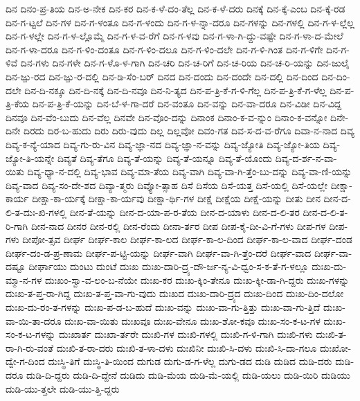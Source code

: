 {ದಿನ
ದಿನಂ-ಪ್ರ-ತಿಯ
ದಿನ-ಅ-ನೇಕ
ದಿನ-ಕರ
ದಿನ-ಕ-ಳೆ-ದಂ-ತೆಲ್ಲ
ದಿನ-ಕ-ಳೆ-ದರು
ದಿನಕ್ಕೆ
ದಿನ-ಕ್ಕೆ-ಎಂಬ
ದಿನ-ಕ್ಕೆ-ರಡ
ದಿನ-ಗ-ಟ್ಟಲೆ
ದಿನ-ಗಳ
ದಿನ-ಗ-ಳಂತೂ
ದಿನ-ಗ-ಳಂದು
ದಿನ-ಗ-ಳ-ನ್ನಾ-ದರೂ
ದಿನ-ಗಳನ್ನು
ದಿನ-ಗಳಲ್ಲಿ
ದಿನ-ಗ-ಳ-ಲ್ಲೆಲ್ಲ
ದಿನ-ಗ-ಳಲ್ಲೇ
ದಿನ-ಗ-ಳ-ಲ್ಲೊಮ್ಮೆ
ದಿನ-ಗ-ಳ-ವ-ರೆಗೆ
ದಿನ-ಗ-ಳವು
ದಿನ-ಗ-ಳಾ-ಗಿ-ದ್ದು-ವಷ್ಟೇ
ದಿನ-ಗ-ಳಾ-ದ-ಮೇಲೆ
ದಿನ-ಗ-ಳಾ-ದರೂ
ದಿನ-ಗ-ಳಿಂ-ದಂತೂ
ದಿನ-ಗ-ಳಿಂ-ದಲೂ
ದಿನ-ಗ-ಳಿಂ-ದಲೇ
ದಿನ-ಗ-ಳಿ-ಗಿಂತ
ದಿನ-ಗ-ಳಿಗೇ
ದಿನ-ಗ-ಳಿವೆ
ದಿನ-ಗಳು
ದಿನ-ಗಳೇ
ದಿನ-ಗ-ಳೊ-ಳ-ಗಾಗಿ
ದಿನ-ಚರಿ
ದಿನ-ಚ-ರಿಗೆ
ದಿನ-ಚ-ರಿಯ
ದಿನ-ಚ-ರಿ-ಯನ್ನು
ದಿನ-ಜುಲೈ
ದಿನ-ಜ್ಪು-ರದ
ದಿನ-ಜ್ಪು-ರ-ದಲ್ಲಿ
ದಿನ-ಡಿ-ಸೆಂ-ಬರ್
ದಿನದ
ದಿನ-ದಂದು
ದಿನ-ದಂದೇ
ದಿನ-ದಲ್ಲಿ
ದಿನ-ದಿಂದ
ದಿನ-ದಿಂ-ದಲೇ
ದಿನ-ದಿ-ನಕ್ಕೂ
ದಿನ-ದಿ-ನಕ್ಕೆ
ದಿನ-ದಿ-ನವೂ
ದಿನ-ನಿ-ತ್ಯದ
ದಿನ-ಪ-ತ್ರಿ-ಕೆ-ಗ-ಳಿ-ಗೆಲ್ಲ
ದಿನ-ಪ-ತ್ರಿ-ಕೆ-ಗ-ಳೆಲ್ಲ
ದಿನ-ಪ-ತ್ರಿ-ಕೆಯ
ದಿನ-ಪ-ತ್ರಿ-ಕೆ-ಯನ್ನು
ದಿನ-ಬೆ-ಳ-ಗಾ-ದರೆ
ದಿನ-ವಂತೂ
ದಿನ-ವನ್ನು
ದಿನ-ವಾ-ದರೂ
ದಿನ-ವಿಡೀ
ದಿನ-ವಿದ್ದ
ದಿನವೂ
ದಿನ-ವೆಂ-ಬುದು
ದಿನ-ವೆಲ್ಲ
ದಿನವೇ
ದಿನ-ವೊಂ-ದನ್ನು
ದಿನಾಂಕ
ದಿನಾಂ-ಕ-ವ-ನ್ನುಂ
ದಿನಾಂ-ಕ-ವನ್ನೋ
ದಿನೇ-ದಿನೇ
ದಿರದು
ದಿರ-ಬ-ಹುದು
ದಿರು
ದಿರು-ವುದು
ದಿಲ್ಲ
ದಿಲ್ಲವೋ
ದಿವಂ-ಗತ
ದಿವ-ಸ-ದ-ವ-ರೆಗೂ
ದಿವಾ-ನ-ನಾದ
ದಿವ್ಯ
ದಿವ್ಯ-ಕ-ನ್ಯೆ-ಯಾದ
ದಿವ್ಯ-ಗು-ರು-ವಿನ
ದಿವ್ಯ-ಜ್ಞಾ-ನದ
ದಿವ್ಯ-ಜ್ಞಾ-ನ-ವನ್ನು
ದಿವ್ಯ-ಜ್ಯೋತಿ
ದಿವ್ಯ-ಜ್ಯೋ-ತಿಯ
ದಿವ್ಯ-ಜ್ಯೋ-ತಿ-ಯನ್ನೇ
ದಿವ್ಯತೆ
ದಿವ್ಯ-ತೆಗೂ
ದಿವ್ಯ-ತೆ-ಯನ್ನು
ದಿವ್ಯ-ತೆ-ಯನ್ನೂ
ದಿವ್ಯ-ತೆ-ಯೊಂದು
ದಿವ್ಯ-ದ-ರ್ಶ-ನ-ವಾ-ಯಿತು
ದಿವ್ಯ-ಧ್ಯಾ-ನ-ದಲ್ಲಿ
ದಿವ್ಯ-ಭಾವ
ದಿವ್ಯ-ಮಾ-ತೆಯ
ದಿವ್ಯ-ವಾಗಿ
ದಿವ್ಯ-ವಾ-ಗಿ-ತ್ತೆಂ-ಬು-ದನ್ನು
ದಿವ್ಯ-ವಾ-ಣಿ-ಯನ್ನು
ದಿವ್ಯ-ವಾದ
ದಿವ್ಯ-ಸಂ-ದೇ-ಶದ
ದಿವ್ಯಾ-ತ್ಮರು
ದಿವ್ಯೋ-ತ್ಸಾಹ
ದಿಸೆ
ದಿಸೆಯ
ದಿಸೆ-ಯತ್ತ
ದಿಸೆ-ಯಲ್ಲಿ
ದಿಸೆ-ಯಲ್ಲೇ
ದೀಕ್ಷಾ-ಕಾರ್ಯ
ದೀಕ್ಷಾ-ಕಾ-ರ್ಯಕ್ಕೆ
ದೀಕ್ಷಾ-ಕಾ-ರ್ಯವು
ದೀಕ್ಷಾ-ರ್ಥಿ-ಗಳ
ದೀಕ್ಷೆ
ದೀಕ್ಷೆಯ
ದೀಕ್ಷೆ-ಯನ್ನು
ದೀತು
ದೀನ
ದೀನ-ದ-ಲಿ-ತ-ದುಃ-ಖಿ-ಗಳಲ್ಲಿ
ದೀನ-ತೆ-ಯನ್ನು
ದೀನ-ದ-ಯಾ-ಪ-ರ-ತೆಯ
ದೀನ-ದ-ಯಾಳು
ದೀನ-ದ-ಲಿ-ತರ
ದೀನ-ದ-ಲಿ-ತ-ರಿ-ಗಾಗಿ
ದೀನ-ನಾದ
ದೀನರ
ದೀನ-ರಲ್ಲಿ
ದೀನ-ರೆಂದು
ದೀನಾ-ರ್ತರ
ದೀಪ
ದೀಪ-ಕೈ-ದೀ-ವಿ-ಗೆ-ಗಳು
ದೀಪ-ಗಳ
ದೀಪ-ಗಳು
ದೀಪೋ-ತ್ಸವ
ದೀರ್ಘ
ದೀರ್ಘ-ಕಾಲ
ದೀರ್ಘ-ಕಾ-ಲದ
ದೀರ್ಘ-ಕಾ-ಲ-ದಿಂದ
ದೀರ್ಘ-ಕಾ-ಲ-ವಾದ
ದೀರ್ಘ-ದಂಡ
ದೀರ್ಘ-ದಂ-ಡ-ಪ್ರ-ಣಾಮ
ದೀರ್ಘ-ಪ-ಟ್ಟಿ-ಯನ್ನು
ದೀರ್ಘ-ವಾಗಿ
ದೀರ್ಘ-ವಾ-ಗಿ-ತ್ತೆಂ-ದರೆ
ದೀರ್ಘ-ವಾದ
ದೀರ್ಘ-ವಾ-ದಷ್ಟೂ
ದೀರ್ಘಾಯು
ದುಂಟು
ದುಂಟೆ
ದುಃಖ
ದುಃಖ-ದಾರಿ-ದ್ರ್ಯ-ದೌ-ರ್ಜ-ನ್ಯ-ವಿ-ಧ್ವಂ-ಸ-ಕ-ತೆ-ಗ-ಳಲ್ಲೂ
ದುಃಖ-ದು-ಮ್ಮಾ-ನ-ಗಳ
ದುಃಖಂ-ಸ್ವಾ-ವ-ಲಂ-ಬ-ನೆಯೇ
ದುಃಖ-ಕರ
ದುಃಖ-ಕ್ಕಿಂ-ತೇನೂ
ದುಃಖ-ಕ್ಕೀ-ಡಾ-ಗಿ-ದ್ದರು
ದುಃಖ-ಗಳನ್ನು
ದುಃಖ-ತ-ಪ್ತ-ರಾ-ಗಿದ್ದ
ದುಃಖ-ತ-ಪ್ತ-ವಾ-ಗು-ವುದು
ದುಃಖದ
ದುಃಖ-ದಾರಿ-ದ್ರ್ಯದ
ದುಃಖ-ದಿಂದ
ದುಃಖ-ದಿಂ-ದಲೋ
ದುಃಖ-ದು-ರಂ-ತ-ಗಳನ್ನು
ದುಃಖ-ಪ-ಡ-ಬ-ಹುದೆ
ದುಃಖ-ವನ್ನು
ದುಃಖ-ವಾ-ಗು-ತ್ತಿತ್ತು
ದುಃಖ-ವಾ-ಗು-ತ್ತಿದೆ
ದುಃಖ-ವಾ-ಯಿ-ತಾ-ದರೂ
ದುಃಖ-ವಾ-ಯಿತು
ದುಃಖವೂ
ದುಃಖ-ವೇನೂ
ದುಃಖ-ಶೋ-ಕವೂ
ದುಃಖ-ಸಂ-ಕ-ಟ-ಗಳ
ದುಃಖ-ಸಂ-ಕ-ಟ-ಗಳನ್ನು
ದುಃಖಾರ್ತ
ದುಃಖಾ-ರ್ತರೇ
ದುಃಖಿ-ಗಳ
ದುಃಖಿ-ಗಳಲ್ಲಿ
ದುಃಖಿ-ಗ-ಳಿ-ಗಾಗಿ
ದುಃಖಿ-ಗಳು
ದುಃಖಿ-ತ-ರಾ-ಗಿ-ರು-ವಂತೆ
ದುಃಖಿ-ತ-ರಾ-ದರು
ದುಃಖಿ-ತ-ಳಾ-ದಳು
ದುಃಖಿನೀ
ದುಃಖಿ-ಸಿ-ದಳು
ದುಃಖಿ-ಸಿ-ದಾ-ಗಲೂ
ದುಃಖೋ-ದ್ವೇ-ಗ-ದಿಂದ
ದುಃಸ್ಥಿ-ತಿಗೆ
ದುಃಸ್ಥಿ-ತಿ-ಯಿಂದ
ದುಗುಡ
ದುಗು-ಡ-ಗ-ಳೆಲ್ಲ
ದುಗು-ಡದ
ದುಡಿ
ದುಡಿದ
ದುಡಿ-ದರು
ದುಡಿ-ದರೂ
ದುಡಿ-ದಿ-ದ್ದರು
ದುಡಿ-ದಿ-ದ್ದೇನೆ
ದುಡಿದು
ದುಡಿ-ಮೆಯ
ದುಡಿ-ಮೆ-ಯಲ್ಲಿ
ದುಡಿ-ಯಲು
ದುಡಿ-ಯಿರಿ
ದುಡಿಯು
ದುಡಿ-ಯು-ತ್ತಲೇ
ದುಡಿ-ಯು-ತ್ತಿ-ದ್ದರು
}
